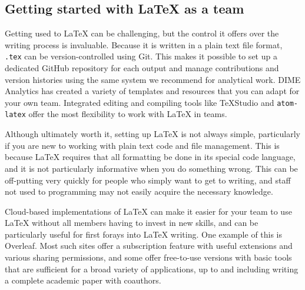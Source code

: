 \subsection{Getting started with {\LaTeX} as a team}

Getting used to {\LaTeX} can be challenging,
but the control it offers over the writing process is invaluable.
Because it is written in a plain text file format,
\texttt{.tex} can be version-controlled using Git.
This makes it possible to set up a dedicated GitHub repository for each output
and manage contributions and version histories
using the same system we recommend for analytical work.
DIME Analytics has created a variety of templates and resources
that you can adapt for your own team.
Integrated editing and compiling tools like TeXStudio
and \texttt{atom-latex}
offer the most flexibility to work with {\LaTeX} in teams.

Although ultimately worth it, setting up {\LaTeX} is not always simple,
particularly if you are new to working with plain text code and file management.
This is because {\LaTeX} requires that all formatting be done in its special code language,
and it is not particularly informative when you do something wrong.
This can be off-putting very quickly for people
who simply want to get to writing,
and staff not used to programming may not easily acquire the necessary knowledge.

Cloud-based implementations of {\LaTeX} can make it easier for your team to use
{\LaTeX} without all members having to invest in new skills,
and can be particularly useful for first forays into {\LaTeX} writing.
One example of this is Overleaf.
Most such sites offer a subscription feature
with useful extensions and various sharing permissions,
and some offer free-to-use versions with basic tools that are sufficient
for a broad variety of applications,
up to and including writing a complete academic paper with coauthors.

